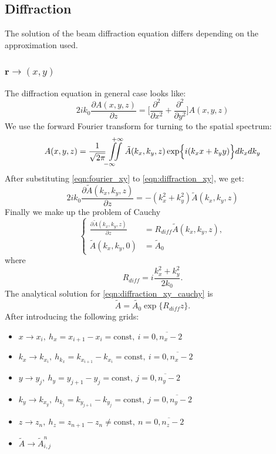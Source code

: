 \documentclass[a4paper, 12pt]{article}
\begin{document}
\subsection{Diffraction}
The solution of the beam diffraction equation differs depending on the approximation used.

\subsubsection{$\mathbf{r}\longrightarrow(x,y)$}

The diffraction equation in general case looks like:
\begin{equation}
\label{eqn:diffraction_xy}
2 i k_0 \frac{\partial A (x, y, z)}{\partial z} = \biggl[ \frac{\partial^2}{\partial x^2} + \frac{\partial^2}{\partial y^2} \biggr] A (x, y, z)
\end{equation}
We use the forward Fourier transform for turning to the spatial spectrum:
\begin{equation}
\label{eqn:fourier_xy}
A(x,y,z) = \frac1{\sqrt{2 \pi}}\iint\limits_{-\infty \quad}^{\quad+\infty} \tilde{A}(k_x, k_y, z) \exp \Bigl\{ i (k_x x + k_y y) \Bigr\} dk_x dk_y
\end{equation}
After substituting \eqref{eqn:fourier_xy} to \eqref{eqn:diffraction_xy}, we get:
\begin{equation}
2 i k_0 \frac{\partial \tilde{A} (k_x, k_y, z)}{\partial z} = -(k_x^2 + k_y^2) \tilde{A}(k_x, k_y, z)
\end{equation}
Finally we make up the problem of Cauchy
\begin{equation}
\label{eqn:diffraction_xy_cauchy}
\left\{
\begin{aligned}
\frac{\partial \tilde{A} (k_x, k_y, z)}{\partial z} &= R_{diff} \tilde{A} (k_x, k_y, z),\\
\tilde{A}(k_x, k_y, 0) &= \tilde{A}_0
\end{aligned}
\right.
\end{equation}
where
\begin{equation}
R_{diff} = i\frac{k_x^2 + k_y^2}{2 k_0}.
\end{equation}
The analytical solution for \eqref{eqn:diffraction_xy_cauchy} is
\begin{equation}
\tilde{A} = \tilde{A_0} \exp\{R_{diff} z\}.
\end{equation}
After introducing the following grids:
\begin{itemize}
\item $x\longrightarrow x_i, \ h_x = x_{i+1} - x_{i} = \text{const}, \ i = \overline{0, n_x-2}$
\item $k_x\longrightarrow k_{x_i}, \ h_{k_x} = k_{x_{i+1}} - k_{x_{i}} = \text{const}, \ i = \overline{0, n_x-2}$
\item $y\longrightarrow y_j, \ h_y = y_{j+1} - y_{j} = \text{const}, \ j = \overline{0, n_y-2}$
\item $k_y\longrightarrow k_{x_y}, \ h_{k_j} = k_{y_{j+1}} - k_{y_{j}} = \text{const}, \ j = \overline{0, n_y-2}$
\item $z\longrightarrow z_n, \ h_z = z_{n+1} - z_{n} \ne \text{const}, \ n = \overline{0, n_z-2}$
\item $\tilde{A} \longrightarrow \tilde{A}^n_{i, j}$
\end{itemize}
\end{document}
